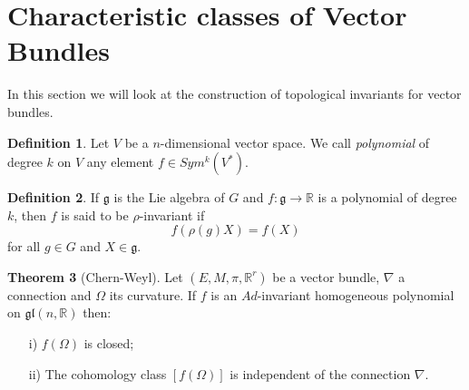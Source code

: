 \documentclass[12pt,a4paper]{report}
\theoremstyle{definition}
\newtheorem{Def}{Definition}[chapter]
\theoremstyle{Theorem}
\newtheorem{Theo}[Def]{Theorem}
\theoremstyle{break}
\theoremstyle{definition}
\begin{document}
	\section{Characteristic classes of Vector Bundles}
	In this section we will look at the construction of topological invariants for vector bundles.
	\begin{Def}
		Let $V$ be a $n$-dimensional vector space. We call \textit{polynomial} of degree $k$ on $V$ any element $f\in Sym^k(V^*)$.
	\end{Def}
	\begin{Def}
		If $\mathfrak{g}$ is the Lie algebra of $G$ and $f:\mathfrak{g}\rightarrow \mathbb{R}$ is a polynomial of degree $k$, then $f$ is said to be $\rho$-invariant if
		$$f(\rho(g)X)=f(X)$$
		for all $g\in G$ and $X\in \mathfrak{g}$.
	\end{Def}
	\begin{Theo}[Chern-Weyl]
		Let $(E,M,\pi,\mathbb{R}^r)$ be a vector bundle, $\nabla$ a connection and $\Omega$ its curvature. If $f$ is an $Ad$-invariant homogeneous polynomial on $\mathfrak{gl}(n,\mathbb{R})$ then:
		\begin{itemize}
			\item[i)] $f(\Omega)$ is closed;
			\item[ii)] The cohomology class $[f(\Omega)]$ is independent of the connection $\nabla$.
		\end{itemize}
	\end{Theo}
\end{document}
